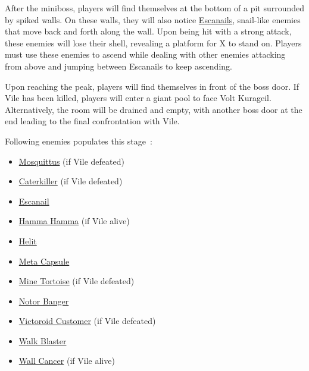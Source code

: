 After the miniboss, players will find themselves at the bottom of a pit surrounded by spiked walls. On these walls, they will also notice \hyperlink{enem:Escanail}{Escanails}, snail-like enemies that move back and forth along the wall. Upon being hit with a strong attack, these enemies will lose their shell, revealing a platform for X to stand on. Players must use these enemies to ascend while dealing with other enemies attacking from above and jumping between Escanails to keep ascending.

Upon reaching the peak, players will find themselves in front of the boss door. If Vile has been killed, players will enter a giant pool to face Volt Kurageil. Alternatively, the room will be drained and empty, with another boss door at the end leading to the final confrontation with Vile.

Following enemies populates this stage~\cite{wiki:Doppler_stage}:
\begin{itemize}
	 \item \hyperlink{miniboss:Mosquittus}{Mosquittus} (if Vile defeated)
	 \item \hyperlink{enem:Caterkiller}{Caterkiller} (if Vile defeated)
	 \item \hyperlink{enem:Escanail}{Escanail}
	 \item \hyperlink{enem:Hamma_Hamma}{Hamma Hamma} (if Vile alive)
	 \item \hyperlink{enem:Helit}{Helit}
	 \item \hyperlink{enem:Meta_Capsule}{Meta Capsule}
	 \item \hyperlink{enem:Mine_Tortoise}{Mine Tortoise} (if Vile defeated)
	 \item \hyperlink{enem:Notor_Banger}{Notor Banger}
	 \item \hyperlink{enem:Victoroid_customer}{Victoroid Customer} (if Vile defeated)
	 \item \hyperlink{enem:Walk_Blaster}{Walk Blaster}
	 \item \hyperlink{enem:Wall_Cancer}{Wall Cancer} (if Vile alive)
\end{itemize}

